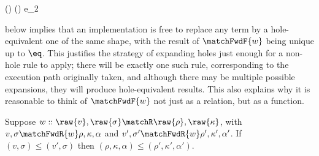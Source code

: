 \begin{smathpar}
   {
      \matchFwd{\hole}
               {}
               {}
               {() \concat ()}
               {e_2}
               {\bot}
   }
\end{smathpar}

\vspace{2mm}
\noindent {} below implies that an implementation is free to replace any term by a hole-equivalent one of the same shape, with the result of $\matchFwdF{w}$ being unique up to $\eq$. This justifies the strategy of expanding holes just enough for a non-hole rule to apply; there will be exactly one such rule, corresponding to the execution path originally taken, and although there may be multiple possible expansions, they will produce hole-equivalent results. This also explains why it is reasonable to think of $\matchFwdF{w}$ not just as a relation, but as a function.

\begin{lemma}
\label{lem:match-fwd:monotonic}
   Suppose $w :: \raw{v}, \raw{\sigma} \matchR \raw{\rho}, \raw{\kappa}$, with $v, \sigma \matchFwdR{w} \rho, \kappa, \alpha$ and $v', \sigma' \matchFwdR{w} \rho', \kappa', \alpha'$. If $(v, \sigma) \leq (v', \sigma)$ then $(\rho, \kappa, \alpha) \leq (\rho', \kappa', \alpha')$.
\end{lemma}

